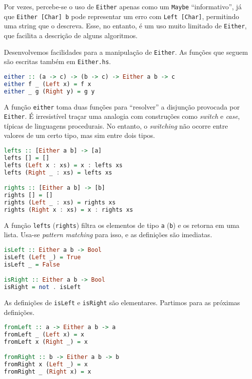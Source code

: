 \documentclass[a4paper]{article}
\begin{document}
Por vezes, percebe-se o uso de \texttt{Either} apenas como um \texttt{Maybe} ``informativo'', já que \mbox{\texttt{Either [Char] b}} pode representar um erro com \texttt{Left [Char]}, permitindo uma string que o descreva.
Esse, no entanto, é um uso muito limitado de \texttt{Either}, que facilita a descrição de alguns algoritmos.

Desenvolvemos facilidades para a manipulação de \texttt{Either}.
As funções que seguem são escritas também em \texttt{Either.hs}.

\begin{lstlisting}[language=haskell, frame=single]
either :: (a -> c) -> (b -> c) -> Either a b -> c
either f _ (Left x) = f x
either _ g (Right y) = g y
\end{lstlisting}

A função \texttt{either} toma duas funções para ``resolver'' a disjunção provocada por \texttt{Either}.
É irresistível traçar uma analogia com construções como \emph{switch} e \emph{case}, típicas de linguagens procedurais.
No entanto, o \emph{switching} não ocorre entre valores de um certo tipo, mas sim entre dois tipos.

\begin{lstlisting}[language=haskell, frame=single]
lefts :: [Either a b] -> [a]
lefts [] = []
lefts (Left x : xs) = x : lefts xs
lefts (Right _ : xs) = lefts xs

rights :: [Either a b] -> [b]
rights [] = []
rights (Left _ : xs) = rights xs
rights (Right x : xs) = x : rights xs
\end{lstlisting}

A função \texttt{lefts} (\texttt{rights}) filtra os elementos de tipo \texttt{a} (\texttt{b}) e os retorna em uma lista.
Usa-se \emph{pattern matching} para isso, e as definições são imediatas.

\pagebreak

\begin{lstlisting}[language=haskell, frame=single]
isLeft :: Either a b -> Bool
isLeft (Left _) = True
isLeft _ = False

isRight :: Either a b -> Bool
isRight = not . isLeft
\end{lstlisting}

As definições de \texttt{isLeft} e \texttt{isRight} são elementares.
Partimos para as próximas definições.

\begin{lstlisting}[language=haskell, frame=single]
fromLeft :: a -> Either a b -> a
fromLeft _ (Left x) = x
fromLeft x (Right _) = x

fromRight :: b -> Either a b -> b
fromRight x (Left _) = x
fromRight _ (Right x) = x
\end{lstlisting}
\end{document}
